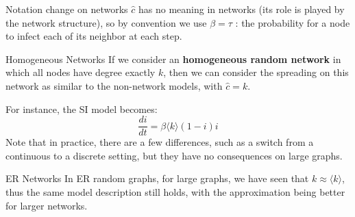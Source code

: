 





\begin{textbox}{Notation change on networks}
    $\hat{c}$ has no meaning in networks (its role is played by the network structure), so by convention we use $\beta=\tau$ : the probability for a node to infect each of its neighbor at each step.
\end{textbox}


\begin{textbox}{Homogeneous Networks}
    If we consider an \textbf{homogeneous random network} in which all nodes have degree exactly $k$, then we can consider the spreading on this network as similar to the non-network models, with $\hat{c}=k$.

    For instance, the SI model becomes:
    \[
        \frac{di}{dt}=\beta \langle k \rangle (1-i)i
    \]
    Note that in practice, there are a few differences, such as a switch from a continuous to a discrete setting, but they have no consequences on large graphs.
\end{textbox}


\begin{textbox}{ER Networks}
    In ER random graphs, for large graphs, we have seen that $k\approx \langle k \rangle$, thus the same model description still holds, with the approximation being better for larger networks.
\end{textbox}


